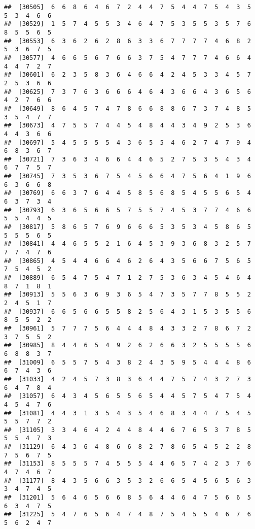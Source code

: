 \documentclass[
]{book}
\begin{document}
\begin{verbatim}
##  [30505]  6  6  8  6  4  6  7  2  4  4  7  5  4  4  7  5  4  3  5  5  3  4  6  6
##  [30529]  1  5  7  4  5  5  3  4  6  4  7  5  3  5  5  3  5  7  6  8  5  5  6  5
##  [30553]  6  3  6  2  6  2  8  6  3  3  6  7  7  7  7  4  6  8  2  5  3  6  7  5
##  [30577]  4  6  6  5  6  7  6  6  3  7  5  4  7  7  7  4  6  6  4  4  4  7  2  7
##  [30601]  6  2  3  5  8  3  6  4  6  6  4  2  4  5  3  3  4  5  7  2  5  3  6  6
##  [30625]  7  3  7  6  3  6  6  6  4  6  4  3  6  6  4  3  6  5  6  4  2  7  6  6
##  [30649]  8  6  4  5  7  4  7  8  6  6  8  8  6  7  3  7  4  8  5  3  5  4  7  7
##  [30673]  4  7  5  5  7  4  4  5  4  8  4  4  3  4  9  2  5  3  6  4  4  3  6  6
##  [30697]  5  4  5  5  5  5  4  3  6  5  5  4  6  2  7  4  7  9  4  6  8  3  6  7
##  [30721]  7  3  6  3  4  6  6  4  4  6  5  2  7  5  3  5  4  3  4  6  7  7  5  7
##  [30745]  7  3  5  3  6  7  5  4  5  6  6  4  7  5  6  4  1  9  6  6  3  6  6  8
##  [30769]  6  6  3  7  6  4  4  5  8  5  6  8  5  4  5  5  6  5  4  6  3  7  3  4
##  [30793]  6  3  6  5  6  6  5  7  5  5  7  4  5  3  7  7  4  6  6  5  5  4  4  5
##  [30817]  5  8  6  5  7  6  9  6  6  6  5  3  5  3  4  5  8  6  5  5  5  5  6  5
##  [30841]  4  4  6  5  5  2  1  6  4  5  3  9  3  6  8  3  2  5  7  7  7  4  7  6
##  [30865]  4  5  4  4  6  6  4  6  2  6  4  3  5  6  6  7  5  6  5  7  5  4  5  2
##  [30889]  6  5  4  7  5  4  7  1  2  7  5  3  6  3  4  5  4  6  4  8  7  1  8  1
##  [30913]  5  5  6  3  6  9  3  6  5  4  7  3  5  7  7  8  5  5  2  2  4  5  1  7
##  [30937]  6  6  5  6  6  5  5  8  2  5  6  4  3  1  5  3  5  5  6  8  5  5  2  2
##  [30961]  5  7  7  7  5  6  4  4  4  8  4  3  3  2  7  8  6  7  2  3  7  5  5  2
##  [30985]  8  4  4  6  5  4  9  2  6  2  6  6  3  2  5  5  5  5  6  6  8  8  3  7
##  [31009]  6  5  5  7  5  4  3  8  2  4  3  5  9  5  4  4  4  8  6  6  7  4  3  6
##  [31033]  4  2  4  5  7  3  8  3  6  4  4  7  5  7  4  3  2  7  3  6  4  7  8  4
##  [31057]  6  4  3  4  5  6  5  5  6  5  4  4  5  7  5  4  7  5  4  4  5  4  7  6
##  [31081]  4  4  3  1  3  5  4  3  5  4  6  8  3  4  4  7  5  4  5  5  5  7  7  2
##  [31105]  3  3  4  6  4  2  4  4  8  4  4  6  7  6  5  3  7  8  5  5  5  4  7  3
##  [31129]  6  4  3  6  4  8  6  6  8  2  7  8  6  5  4  5  2  2  8  7  5  6  7  5
##  [31153]  8  5  5  5  7  4  5  5  5  4  4  6  5  7  4  2  3  7  6  4  7  4  6  7
##  [31177]  8  4  3  5  6  6  3  5  3  2  6  6  5  4  5  6  5  6  3  3  4  7  4  5
##  [31201]  5  6  4  6  5  6  6  8  5  6  4  4  6  4  7  5  6  6  5  6  3  4  7  5
##  [31225]  5  4  7  6  5  6  4  7  4  8  7  5  4  5  5  4  6  7  6  5  6  2  4  7

\end{verbatim}
\end{document}
